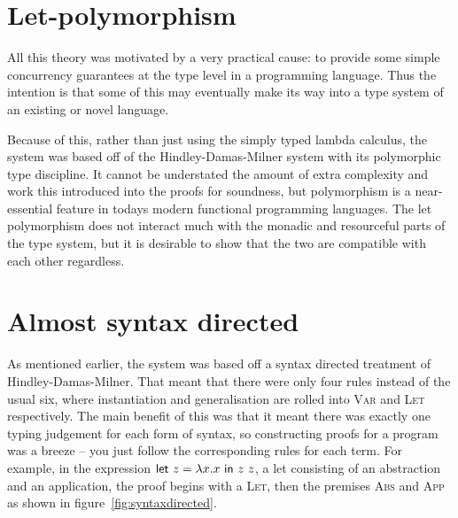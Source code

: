 \section{Let-polymorphism}
All this theory was motivated by a very practical cause: to provide
some simple concurrency guarantees at the type level in a programming
language. Thus the intention is that some of this may eventually make
its way into a type system of an existing or novel language.

Because of this, rather than just using the simply typed lambda
calculus, the system was based off of the Hindley-Damas-Milner system
with its polymorphic type discipline. It cannot be understated the
amount of extra complexity and work this introduced into the proofs
for soundness, but polymorphism is a near-essential feature in todays
modern functional programming languages. The let polymorphism does not
interact much with the monadic and resourceful parts of the type
system, but it is desirable to show that the two are compatible with
each other regardless.

\section{Almost syntax directed}
As mentioned earlier, the system was based off a syntax directed
treatment of Hindley-Damas-Milner. That meant that there were only
four rules instead of the usual six, where instantiation and
generalisation are rolled into \textsc{Var} and \textsc{Let}
respectively. The main benefit of this was that it meant there was
exactly one typing judgement for each form of syntax, so constructing
proofs for a program was a breeze -- you just follow the corresponding rules
for each term. For example, in the expression $\mathsf{let} \ z = \lambda x . x \ \mathsf{in} \ z \
  z$, a let consisting of an abstraction and an application, the proof begins with a
\textsc{Let}, then the premises \textsc{Abs} and \textsc{App} as shown
in figure~\ref{fig:syntaxdirected}.


